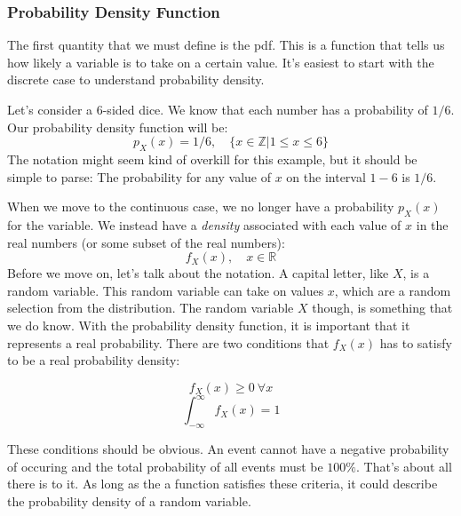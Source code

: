 \subsubsection{Probability Density Function}
The first quantity that we must define is the \gls{pdf}. This is a function that tells us how likely a variable is to take on a certain value. It's easiest to start with the discrete case to understand probability density. 

\begin{example}
Let's consider a $6$-sided dice. We know that each number has a probability of $1/6$. Our probability density function will be:
$$p_X(x)=1/6,\quad\{x\in\mathbb{Z}|1\le x\le 6\}$$
The notation might seem kind of overkill for this example, but it should be simple to parse: The probability for any value of $x$ on the interval $1-6$ is $1/6$.
\end{example}

When we move to the continuous case, we no longer have a probability $p_X(x)$ for the variable. We instead have a \textit{density} associated with each value of $x$ in the real numbers (or some subset of the real numbers):
$$f_X(x),\quad x\in\mathbb{R}$$
Before we move on, let's talk about the notation. A capital letter, like $X$, is a random variable. This random variable can take on values $x$, which are a random selection from the distribution. The random variable $X$ though, is something that we do know. With the probability density function, it is important that it represents a real probability. There are two conditions that $f_X(x)$ has to satisfy to be a real probability density:

$$f_X(x)\ge 0 \  \forall x$$
$$\int_{-\infty}^\infty{f_X(x)}=1
$$

These conditions should be obvious. An event cannot have a negative probability of occuring and the total probability of all events must be $100\%$. That's about all there is to it. As long as the a function satisfies these criteria, it could describe the probability density of a random variable. 

